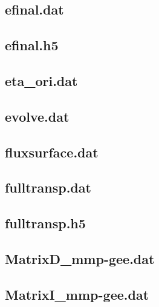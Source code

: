 \subsection{efinal.dat}

\subsection{efinal.h5}

\subsection{eta\_ori.dat}

\subsection{evolve.dat}

\subsection{fluxsurface.dat}

\subsection{fulltransp.dat}

\subsection{fulltransp.h5}

\subsection{MatrixD\_mmp-gee.dat}

\subsection{MatrixI\_mmp-gee.dat}

